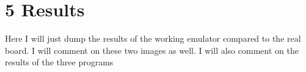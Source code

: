 

\chapter*{5 Results}
\label{results}
\setcounter{chapter}{5}
\setcounter{section}{0}
\setcounter{figure}{0}
\setcounter{table}{0}

\color{green} Here I will just dump the results of the working emulator compared to the real board. I will comment on these two images as well. I will also comment on the results of the three programs \color{black}